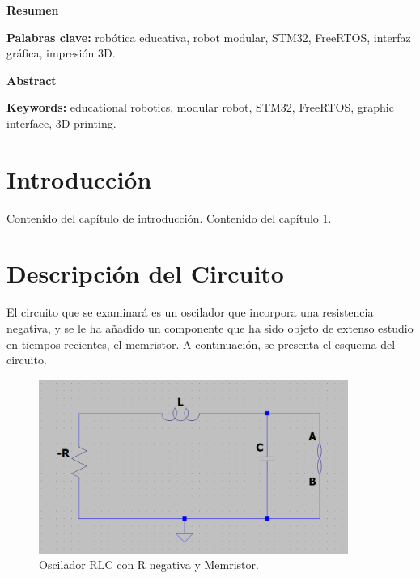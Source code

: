 \documentclass[12pt,a4paper]{report} %
\begin{document}
	\clearpage
	\null
	\thispagestyle{empty}
	\newpage

\begin{center}
	\LARGE\textbf{Resumen}
\end{center}
\begin{minipage}{\textwidth}
	\lipsum[1]
	
	\vspace{0.5cm}
	\noindent \textbf{Palabras clave:} robótica educativa, robot modular, STM32, FreeRTOS, interfaz gráfica, impresión 3D.
\end{minipage}

\vspace{1cm}

\begin{center}
	\LARGE\textbf{Abstract}
\end{center}
\begin{minipage}{\textwidth}
	\lipsum[2]
	
	\vspace{0.5cm}
	\noindent \textbf{Keywords:} educational robotics, modular robot, STM32, FreeRTOS, graphic interface, 3D printing.
\end{minipage}
\newpage
	
\tableofcontents
	\chapter{Introducción}
	Contenido del capítulo de introducción. Contenido del capítulo 1.
	
	\chapter{Descripción del Circuito}
	\noindent El circuito que se examinará es un oscilador que incorpora una resistencia negativa, y se le ha añadido un componente que ha sido objeto de extenso estudio en tiempos recientes, el memristor. A continuación, se presenta el esquema del circuito.
	
	\vspace{0.5cm}\begin{figure}[h]
		\centering
		\includegraphics[width=0.9\textwidth]{-RLCM.png}
		\caption{Oscilador RLC con R negativa y Memristor.}
		\label{fig:-RLCM}
	\end{figure}
	
\end{document}
